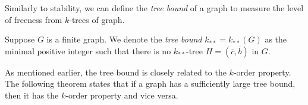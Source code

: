 
    Similarly to stability, we can define the \emph{tree bound} of a graph to measure the level of freeness from $k$-trees
    of graph.

    \begin{definition}[Definition 2.11] \label{def:tree_bound}
        Suppose $G$ is a finite graph.
        We denote the \emph{tree bound} $k_{**} = k_{**}(G)$ as the minimal positive integer such that there is no
        $k_{**}$-tree $H = (\overline{c},\overline{b})$ in $G$.
    \end{definition}

    As mentioned earlier, the tree bound is closely related to the $k$-order property.
    The following theorem states that if a graph has a sufficiently large tree bound, then it has the $k$-order property
    and vice versa.

